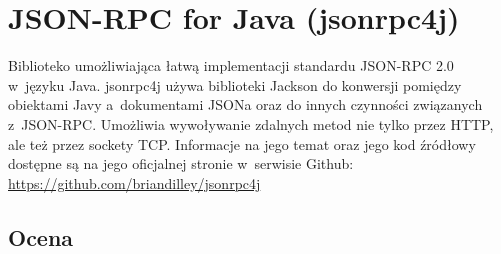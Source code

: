 %
%
%



\section{JSON-RPC for Java (jsonrpc4j)}
Biblioteko umożliwiająca łatwą implementacji standardu JSON-RPC 2.0 w~języku Java.
jsonrpc4j używa biblioteki Jackson do konwersji pomiędzy obiektami Javy a~dokumentami JSONa oraz do innych czynności związanych z~JSON-RPC.
Umożliwia wywoływanie zdalnych metod nie tylko przez HTTP, ale też przez sockety TCP.
Informacje na jego temat oraz jego kod źródłowy dostępne są na jego oficjalnej stronie w~serwisie Github: \url{https://github.com/briandilley/jsonrpc4j}

\subsection{Ocena}

